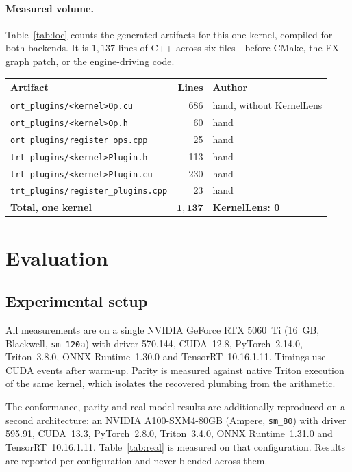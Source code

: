 \documentclass[11pt,a4paper]{article}
\begin{document}
\paragraph{Measured volume.} Table~\ref{tab:loc} counts the generated artifacts
for this one kernel, compiled for both backends. It is $1{,}137$ lines of
C++ across six files---before CMake, the FX-graph patch, or the engine-driving
code.

\begin{center}
\small
\begin{tabular}{l r l}
\toprule
\textbf{Artifact} & \textbf{Lines} & \textbf{Author} \\ \midrule
\texttt{ort\_plugins/<kernel>Op.cu} & 686 & hand, without KernelLens \\
\texttt{ort\_plugins/<kernel>Op.h} & 60 & hand \\
\texttt{ort\_plugins/register\_ops.cpp} & 25 & hand \\
\texttt{trt\_plugins/<kernel>Plugin.h} & 113 & hand \\
\texttt{trt\_plugins/<kernel>Plugin.cu} & 230 & hand \\
\texttt{trt\_plugins/register\_plugins.cpp} & 23 & hand \\ \midrule
\textbf{Total, one kernel} & $\mathbf{1{,}137}$ & \textbf{KernelLens: 0} \\
\bottomrule
\end{tabular}
\label{tab:loc}
\end{center}

\section{Evaluation}
\label{sec:eval}

\subsection{Experimental setup}

All measurements are on a single NVIDIA GeForce RTX 5060~Ti (16~GB, Blackwell,
\texttt{sm\_120a}) with driver 570.144, CUDA~12.8, PyTorch~2.14.0, Triton~3.8.0,
ONNX Runtime~1.30.0 and TensorRT~10.16.1.11. Timings use CUDA events after
warm-up. Parity is measured against native Triton execution of the same kernel,
which isolates the recovered plumbing from the arithmetic.

The conformance, parity and real-model results are additionally reproduced on a
second architecture: an NVIDIA A100-SXM4-80GB (Ampere, \texttt{sm\_80}) with
driver 595.91, CUDA~13.3, PyTorch~2.8.0, Triton~3.4.0, ONNX
Runtime~1.31.0 and TensorRT~10.16.1.11. Table~\ref{tab:real} is measured on
that configuration. Results are reported per configuration and never blended
across them.
\end{document}
